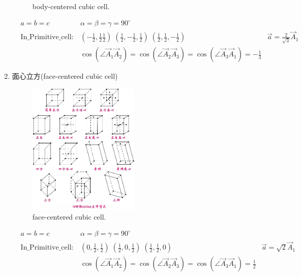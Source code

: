 \documentclass{article}      %
\begin{document}
\begin{enumerate}
\begin{figure}[h!]
\caption{\small body-centered cubic cell.}%
\label{Bravais:body-centered Cubic}
\end{figure}
\begin{displaymath}
	\begin{aligned}
		& a=b=c &\alpha=\beta=\gamma=90^{\circ} \\
		&\mathrm{In\_Primitive\_cell}: &(-\frac12,\frac12\frac12)\;(\frac12,-\frac12,\frac12)\;(\frac12,\frac12,-\frac12)\;\;\;\;&\vec a=\frac2{\sqrt 3}\vec A_1\\
		& &\cos(\angle\vec A_1\vec A_2)=\cos(\angle\vec A_2\vec A_3)=\cos(\angle\vec A_3\vec A_1)=-\frac13
	\end{aligned}
\end{displaymath}
		\item 面心立方(\textrm{face-centered cubic cell})
\begin{figure}[h!]
\centering
\includegraphics[width=0.5\textwidth,viewport=300 460 420 580,clip]{Bravias.jpg}
\caption{\small face-centered cubic cell.}%
\label{Bravais:face-centered Cubic}
\end{figure}
\begin{displaymath}
	\begin{aligned}
	& a=b=c\qquad &\alpha=\beta=\gamma=90^{\circ}\\
		&\mathrm{In\_Primitive\_cell}:&(0,\frac12,\frac12)\;(\frac12,0,\frac12)\;(\frac12,\frac12,0)\;\;\;\;&\vec a=\sqrt 2\vec A_1\\
		& &\cos(\angle\vec A_1\vec A_2)=\cos(\angle\vec A_2\vec A_3)=\cos(\angle\vec A_3\vec A_1)=\frac12
	\end{aligned}
\end{displaymath}

\end{enumerate}
\end{document}
